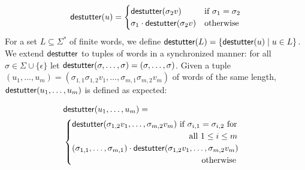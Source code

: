 \begin{equation*}
	\mathsf{destutter}(u) =
	\begin{cases}
		\mathsf{destutter}(\sigma_2 v) & \text{if } \sigma_1 = \sigma_2 \\
		\sigma_1 \cdot \mathsf{destutter}(\sigma_2 v) & \text{otherwise}
	\end{cases}
\end{equation*}
For a set $L \subseteq \Sigma^*$ of finite words, we define $\destutter(L) = 
\{\destutter(u) \st u \in L\}$.
%
We extend $\mathsf{destutter}$ to tuples of words in a synchronized manner: for all $\sigma \in \Sigma \cup \{\epsilon\}$  let $\mathsf{destutter}(\sigma, \ldots, \sigma) = (\sigma, \ldots, \sigma)$.
Given a tuple $(u_1, \ldots, u_m) = (\sigma_{1,1} \sigma_{1,2} v_1, \ldots, \sigma_{m,1} \sigma_{m,2} v_m)$ of words of the same length, $\mathsf{destutter}(u_1, \ldots, u_m)$ is defined as expected:

\begin{align*}
	&\destutter(u_1, \ldots, u_m) = \\
	&\begin{cases}
		\destutter(\sigma_{1,2} v_1, \ldots, \sigma_{m,2} v_m) \text{ if $\sigma_{i,1} = \sigma_{i,2}$ for}\\ 
		\hspace{14em}\text{all $1 \leq i \leq m$} \\
		(\sigma_{1,1}, \ldots, \sigma_{m,1}) \cdot \destutter(\sigma_{1,2} v_1, \ldots, \sigma_{m,2} v_m) \\
		\hspace{15.5em}\text{otherwise}
	\end{cases}
\end{align*}

